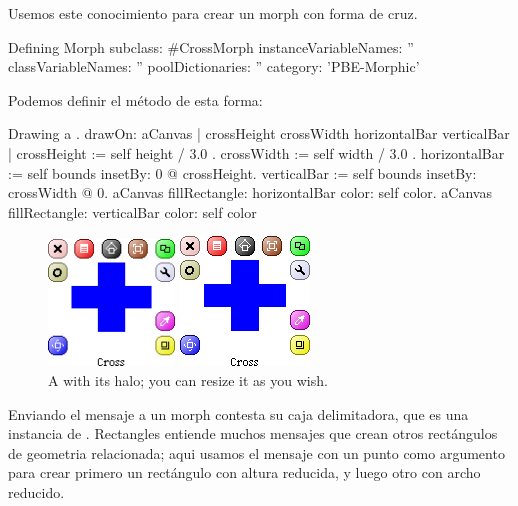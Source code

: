 \documentclass[a4paper,10pt,twoside]{book}
\begin{document}
Usemos este conocimiento para crear un morph con forma de cruz.

\begin{classdef}{Defining }
Morph subclass: #CrossMorph
	instanceVariableNames: ''
	classVariableNames: ''
	poolDictionaries: ''
	category: 'PBE-Morphic'
\end{classdef}

Podemos definir el m\'etodo  de esta forma:
\begin{method}[firstDrawOn]{Drawing a .}
drawOn: aCanvas 
	| crossHeight crossWidth horizontalBar verticalBar |
	crossHeight := self height / 3.0 .
	crossWidth := self width / 3.0 .
	horizontalBar := self bounds insetBy: 0 @ crossHeight.
	verticalBar := self bounds insetBy: crossWidth @ 0.
	aCanvas fillRectangle: horizontalBar color: self color.
	aCanvas fillRectangle: verticalBar color: self color
\end{method}


\begin{figure}[hbt]
	\ifluluelse
		{\centerline{\includegraphics[width=0.3\textwidth]{NewCross}}}
		{\centerline{\includegraphics{NewCross}}}
	\caption{A  with its halo; you can resize it as you wish.
		}
\end{figure}


Enviando el mensaje  a un morph contesta su caja delimitadora, que es una instancia de .  Rectangles entiende muchos mensajes que crean otros rect\'angulos de geometria relacionada; aqui usamos el mensaje  con un punto como argumento para crear primero un  rect\'angulo con altura reducida, y luego otro con archo reducido.
\end{document}
